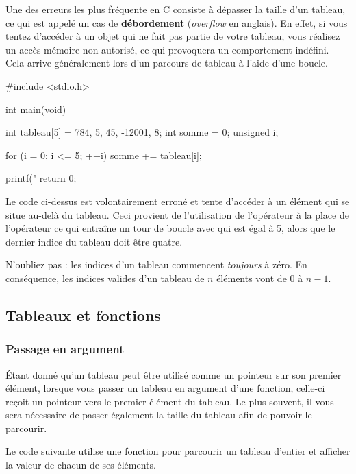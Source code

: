 Une des erreurs les plus fréquente en C consiste à dépasser la taille
d'un tableau, ce qui est appelé un cas de \textbf{débordement}
(\emph{overflow} en anglais). En effet, si vous tentez d'accéder à un
objet qui ne fait pas partie de votre tableau, vous réalisez un accès
mémoire non autorisé, ce qui provoquera un comportement indéfini. Cela
arrive généralement lors d'un parcours de tableau à l'aide d'une boucle.

\begin{C}
#include <stdio.h>


int main(void)
{
    int tableau[5] = {784, 5, 45, -12001, 8};
    int somme = 0;
    unsigned i; 

    for (i = 0; i <= 5; ++i)
        somme += tableau[i];

    printf("%
    return 0;
}
\end{C}

Le code ci-dessus est volontairement erroné et tente d'accéder à un
élément qui se situe au-delà du tableau. Ceci provient de l'utilisation
de l'opérateur \mybox{\textless{}=} à la place de l'opérateur
\mybox{\textless{}} ce qui entraîne un tour de boucle avec 
qui est égal à 5, alors que le dernier indice du tableau doit être
quatre.

\begin{attentionbox}
  N'oubliez pas : les indices d'un
tableau commencent \emph{toujours} à zéro. En conséquence, les indices
valides d'un tableau de \(n\) éléments vont de 0 à \(n-1\).
\end{attentionbox}


\subsection{Tableaux et fonctions}
\label{tableaux-et-fonctions}

\subsubsection{Passage en argument}
\label{passage-en-argument-1}

Étant donné qu'un tableau peut être utilisé comme un pointeur sur son
premier élément, lorsque vous passer un tableau en argument d'une
fonction, celle-ci reçoit un pointeur vers le premier élément du
tableau. Le plus souvent, il vous sera nécessaire de passer également la
taille du tableau afin de pouvoir le parcourir.

Le code suivante utilise une fonction pour parcourir un tableau d'entier
et afficher la valeur de chacun de ses éléments.


